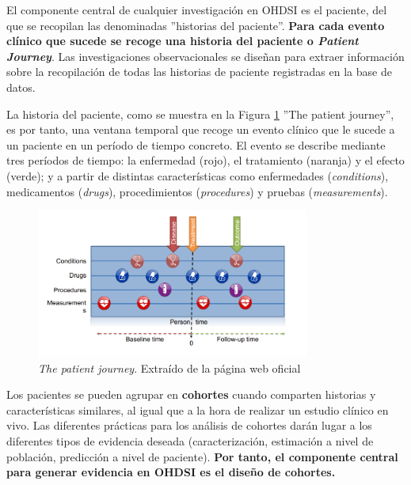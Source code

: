 
El componente central de cualquier investigación en OHDSI es el paciente, del que se recopilan las denominadas ''historias del paciente''. \textbf{Para cada evento clínico que sucede se recoge una historia del paciente o \textit{Patient Journey}}. %
Las investigaciones observacionales se diseñan para extraer información sobre la recopilación de todas las historias de paciente registradas en la base de datos.

La historia del paciente,  como se muestra en la Figura \ref{fig:patientJourney} ''The patient journey'', es por tanto, una ventana temporal que recoge un evento clínico que le sucede a un paciente en un período de tiempo concreto. El evento se describe mediante tres períodos de tiempo: la enfermedad (rojo), el tratamiento (naranja) y el efecto (verde); y a partir de distintas características como enfermedades (\textit{conditions}), medicamentos (\textit{drugs}), procedimientos (\textit{procedures}) y pruebas (\textit{measurements}).

\begin{figure}[H]
    \centering
    \includegraphics[width=0.80\textwidth]{figures/patientJourney.png}
     \caption{\textit{The patient journey}. Extraído de la página web oficial \cite{OHDSIbook}}
    \label{fig:patientJourney}
\end{figure}

Los pacientes se pueden agrupar en \textbf{cohortes} cuando comparten historias y características similares, al igual que a la hora de realizar un estudio clínico en vivo. Las diferentes  prácticas para los análisis de cohortes darán lugar a los diferentes tipos de evidencia deseada (caracterización, estimación a nivel de población, predicción a nivel de paciente). \textbf{Por tanto, el componente central para generar evidencia en OHDSI es el diseño de cohortes.}

